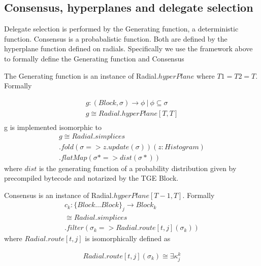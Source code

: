 \documentclass{article}
\begin{document}
\subsection{Consensus, hyperplanes and delegate selection}
Delegate selection is performed by the Generating function, a deterministic function. Consensus is a probabalistic function. Both are defined by the hyperplane function defined on radials. Specifically we use the framework above to formally define the Generating function and Consensus

The Generating function is an instance of  Radial.$hyperPlane$ where $T1 = T2 = T$. Formally 

\begin{equation} \label{eq1}
\begin{split}
g: (Block, \sigma) \rightarrow \phi \ | \ \phi \subseteq \sigma \\
g \cong Radial.hyperPlane[T,T] \\
\end{split}
\end{equation}
g is implemented isomorphic to 
\begin{equation} \label{eq1}
\begin{split}
g \cong Radial.simplices \\
.fold(\sigma => z.update(\sigma))(z: Histogram) \\
.flatMap(\sigma* => dist(\sigma*))
\end{split}
\end{equation}
where $dist$ is the generating function of a probability distribution given by precompiled bytecode and notarized by the TGE Block.

Consensus is an instance of Radial.$hyperPlane[T-1, T]$. Formally 
\begin{equation} \label{eq1}
\begin{split}
c_k: \{Block \dots Block\}_j \rightarrow Block_k \\
\cong Radial.simplices \\
.filter(\sigma_k => Radial.route[t,j](\sigma_k))
\end{split}
\end{equation}
where $Radial.route[t,j]$ is isomorphically defined as

\begin{equation} \label{eq1}
\begin{split}
Radial.route[t,j](\sigma_k) \cong \exists \kappa_j^{k}
\end{split}
\end{equation}
\end{document}

